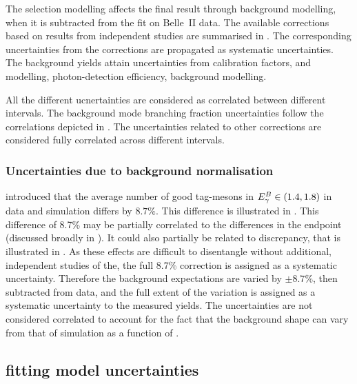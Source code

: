 The selection modelling affects the final result through background modelling, when it is subtracted from the \Mbc fit on Belle~II data.
The available corrections based on results from independent studies are summarised in .
The corresponding uncertainties from the corrections are propagated as systematic uncertainties.
The background yields attain uncertainties from \FEI calibration factors, \piVeto and \etaVeto modelling, photon-detection efficiency, background modelling. 

All the different ucnertainties are considered as correlated between different \EB intervals.
The background mode branching fraction uncertainties follow the correlations depicted in .
The uncertainties related to other corrections are considered fully correlated across different \EB intervals.

\subsubsection{Uncertainties due to background normalisation}\label{sec:background_normalisation_systematic}

 introduced that the average number of 
good tag-\B mesons in ${E^B_{\gamma}}\in(1.4,1.8)$ in data and simulation differs by $8.7\%$.
This difference is illustrated in .
This difference of 8.7\% may be partially correlated to the differences in the \Mbc endpoint (discussed broadly in ).
It could also partially be related to \ZMVA discrepancy, that is illustrated in .
As these effects are difficult to disentangle without additional, independent studies of the, the full 8.7\% correction is assigned as a systematic uncertainty.
Therefore the background expectations are varied by $\pm 8.7\%$, then subtracted from data, and the full extent of the variation is assigned as a systematic uncertainty to the measured \BtoXsgamma yields.
The uncertainties are not considered correlated to account for the fact that the background shape can vary from that of simulation as a function of \EB.



\subsection{\texorpdfstring{\Mbc}{Mbc} fitting model uncertainties}\label{sec:fit_uncertainties}

